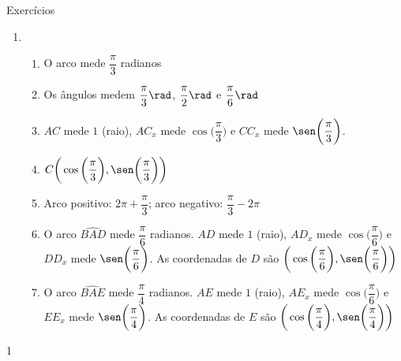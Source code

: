 \begin{answer}{Exercícios}
{\exerciselist\small
\begin{enumerate}
\item 
\begin{enumerate}
\item O arco mede $\dfrac{\pi}{3}$ radianos 

\item Os ângulos medem $\dfrac{\pi}{3}\rad$, $\dfrac{\pi}{2}\rad$ e $\dfrac{\pi}{6}\rad$

\item $AC$ mede $1$ (raio), $AC_x$ mede $\cos\bigg(\dfrac{\pi}{3}\bigg)$ e $CC_x$ mede $\sen\bigg(\dfrac{\pi}{3}\bigg)$.

\item $C\bigg(\cos\bigg(\dfrac{\pi}{3}\bigg),\sen\bigg(\dfrac{\pi}{3}\bigg)\bigg)$

\item Arco positivo: $2\pi+\dfrac{\pi}{3}$; arco negativo: $\dfrac{\pi}{3}-2\pi$

\item O arco $\widehat{BAD}$ mede $\dfrac{\pi}{6}$ radianos. $AD$ mede $1$ (raio), $AD_x$ mede $\cos\bigg(\dfrac{\pi}{6}\bigg)$ e $DD_x$ mede $\sen\bigg(\dfrac{\pi}{6}\bigg)$. As coordenadas de $D$ são $\bigg(\cos\bigg(\dfrac{\pi}{6}\bigg), \sen\bigg(\dfrac{\pi}{6}\bigg)\bigg)$

\item O arco $\widehat{BAE}$ mede $\dfrac{\pi}{4}$ radianos. $AE$ mede $1$ (raio), $AE_x$ mede $\cos\bigg(\dfrac{\pi}{6}\bigg)$ e $EE_x$ mede
$\sen\bigg(\dfrac{\pi}{4}\bigg)$. As coordenadas de $E$ são $\bigg(\cos\bigg(\dfrac{\pi}{4}\bigg), \sen\bigg(\dfrac{\pi}{4}\bigg)\bigg)$
\end{enumerate}
\end{enumerate}
}{1}
\end{answer}
